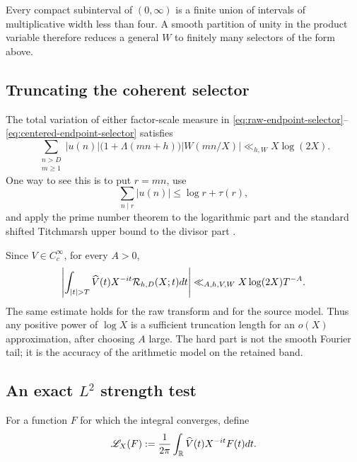\begin{remark}
Every compact subinterval of $(0,\infty)$ is a finite union of intervals
of multiplicative width less than four.  A smooth partition of unity in
the product variable therefore reduces a general $W$ to finitely many
selectors of the form above.
\end{remark}

\subsection{Truncating the coherent selector}

The total variation of either factor-scale measure in
\eqref{eq:raw-endpoint-selector}--\eqref{eq:centered-endpoint-selector}
satisfies
\begin{equation}
 \sum_{\substack{n>D\\m\geq1}}
 |u(n)|\bigl(1+\Lambda(mn+h)\bigr)|W(mn/X)|
 \ll_{h,W}X\log(2X).
 \label{eq:endpoint-total-variation}
\end{equation}
One way to see this is to put $r=mn$, use
\[
 \sum_{n\mid r}|u(n)|\leq\log r+\tau(r),
\]
and apply the prime number theorem to the logarithmic part and the
standard shifted Titchmarsh upper bound to the divisor part
\citep{AssingBlomerLi2021}.

Since $V\in C_c^\infty$, for every $A>0$,
\begin{equation}
 \left|\int_{|t|>T}\widehat V(t)X^{-it}
 \cR_{h,D}(X;t)dt\right|
 \ll_{A,h,V,W}X\log(2X)T^{-A}.
 \label{eq:endpoint-Fourier-tail}
\end{equation}
The same estimate holds for the raw transform and for the source model.
Thus any positive power of $\log X$ is a sufficient truncation length for
an $o(X)$ approximation, after choosing $A$ large.  The hard part is not
the smooth Fourier tail; it is the accuracy of the arithmetic model on
the retained band.

\subsection{An exact \texorpdfstring{$L^2$}{L2} strength test}

For a function $F$ for which the integral converges, define
\begin{equation}
 \mathscr L_X(F):=\frac1{2\pi}\int_\mathbb R
 \widehat V(t)X^{-it}F(t)dt.
 \label{eq:endpoint-functional}
\end{equation}

